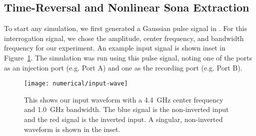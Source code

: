 \subsection{Time-Reversal and Nonlinear Sona Extraction}
To start any simulation, we first generated a Gaussian pulse signal in \matlab{}. For this interrogation signal, we chose the amplitude, center frequency, and bandwidth frequency for our experiment. An example input signal is shown inset in Figure~\ref{fig:numerical-input-wave}. The simulation was run using this pulse signal, noting one of the ports as an injection port (e.g. Port A) and one as the recording port (e.g. Port B).


\begin{figure}[t]
\centering
\texttt{[image: numerical/input-wave]}
\caption[Example of inverted and non-inverted interrogation signals]{This shows our input waveform with a 4.4~GHz center frequency and 1.0~GHz bandwidth. The blue signal is the non-inverted input and the red signal is the inverted input. A singular, non-inverted waveform is shown in the inset.}
\label{fig:numerical-input-wave}
\end{figure}

